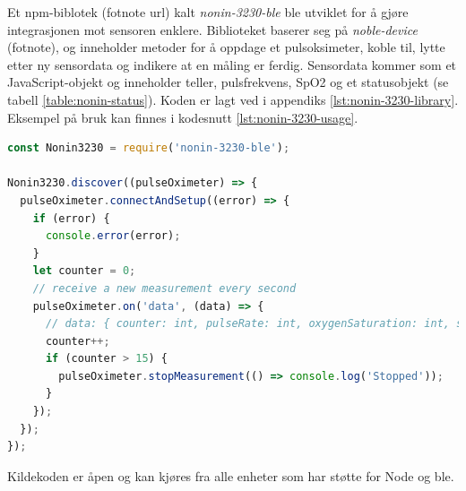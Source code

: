 Et \gls{npm}-biblotek (fotnote url) kalt \textit{nonin-3230-ble} ble utviklet for å gjøre integrasjonen mot sensoren enklere.
Biblioteket baserer seg på \textit{noble-device} (fotnote), og inneholder metoder for å oppdage et pulsoksimeter,
koble til, lytte etter ny sensordata og indikere at en måling er ferdig. Sensordata kommer som et JavaScript-objekt
og inneholder teller, pulsfrekvens, SpO2 og et statusobjekt (se tabell \ref{table:nonin-status}).
Koden er lagt ved i appendiks \ref{lst:nonin-3230-library}.
Eksempel på bruk kan finnes i kodesnutt \ref{lst:nonin-3230-usage}.

\begin{minipage}{\linewidth}
\begin{lstlisting}[frame=single, language=JavaScript,
    caption=Bruk av nonin-3230-ble, label=lst:nonin-3230-usage]
const Nonin3230 = require('nonin-3230-ble');

Nonin3230.discover((pulseOximeter) => {
  pulseOximeter.connectAndSetup((error) => {
    if (error) {
      console.error(error);
    }
    let counter = 0;
    // receive a new measurement every second
    pulseOximeter.on('data', (data) => {
      // data: { counter: int, pulseRate: int, oxygenSaturation: int, status: object }
      counter++;
      if (counter > 15) {
        pulseOximeter.stopMeasurement(() => console.log('Stopped'));
      }
    });
  });
});
\end{lstlisting}
\end{minipage}

Kildekoden er åpen og kan kjøres fra alle enheter som har støtte for Node og \gls{ble}.


